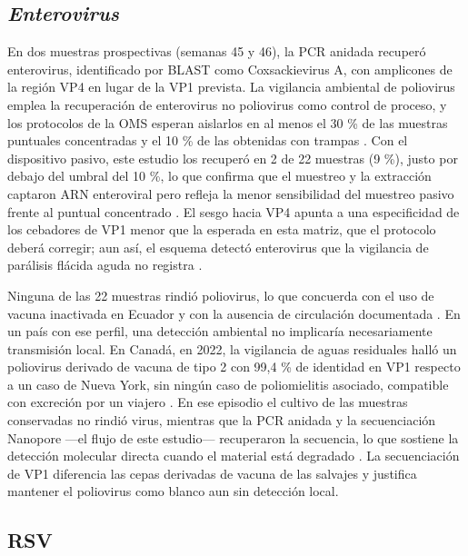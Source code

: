 \subsection{\textit{Enterovirus}}

En dos muestras prospectivas (semanas 45 y 46), la PCR anidada recuperó enterovirus, identificado por BLAST como Coxsackievirus A, con amplicones de la región VP4 en lugar de la VP1 prevista. La vigilancia ambiental de poliovirus emplea la recuperación de enterovirus no poliovirus como control de proceso, y los protocolos de la OMS esperan aislarlos en al menos el 30 \% de las muestras puntuales concentradas y el 10 \% de las obtenidas con trampas \cite{OReilly_2020,Bubba_2023}. Con el dispositivo pasivo, este estudio los recuperó en 2 de 22 muestras (9 \%), justo por debajo del umbral del 10 \%, lo que confirma que el muestreo y la extracción captaron ARN enteroviral pero refleja la menor sensibilidad del muestreo pasivo frente al puntual concentrado \cite{Rozanec_2026}. El sesgo hacia VP4 apunta a una especificidad de los cebadores de VP1 menor que la esperada en esta matriz, que el protocolo deberá corregir; aun así, el esquema detectó enterovirus que la vigilancia de parálisis flácida aguda no registra \cite{Asghar_2014}.

Ninguna de las 22 muestras rindió poliovirus, lo que concuerda con el uso de vacuna inactivada en Ecuador y con la ausencia de circulación documentada \cite{Zurbriggen_2008,Asghar_2014}. En un país con ese perfil, una detección ambiental no implicaría necesariamente transmisión local. En Canadá, en 2022, la vigilancia de aguas residuales halló un poliovirus derivado de vacuna de tipo 2 con 99,4 \% de identidad en VP1 respecto a un caso de Nueva York, sin ningún caso de poliomielitis asociado, compatible con excreción por un viajero \cite{Seo_2025}. En ese episodio el cultivo de las muestras conservadas no rindió virus, mientras que la PCR anidada y la secuenciación Nanopore —el flujo de este estudio— recuperaron la secuencia, lo que sostiene la detección molecular directa cuando el material está degradado \cite{Seo_2025}. La secuenciación de VP1 diferencia las cepas derivadas de vacuna de las salvajes \cite{Klapsa_2022} y justifica mantener el poliovirus como blanco aun sin detección local.

\subsection{RSV}

